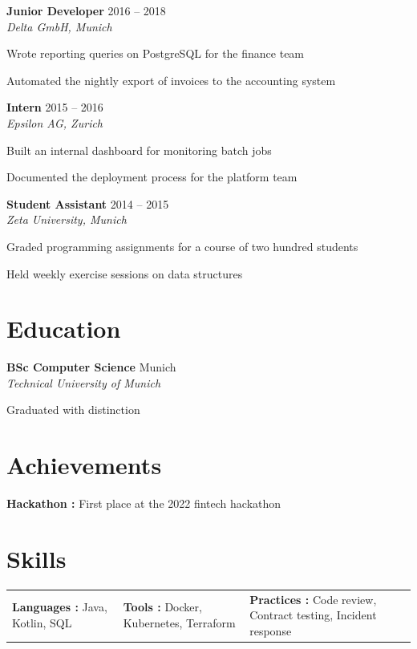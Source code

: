 \documentclass[10pt]{extarticle}
\newcommand{\role}[3]{%
  \textbf{#1} \hfill {\color{soft}\small #3}\\[-1pt]
  {\itshape\small #2}\par
}
\newcommand{\edu}[3]{%
  \textbf{#1} \hfill {\color{soft}\small #3}\\[-1pt]
  {\itshape\small #2}\par
}
\begin{document}
\role{Junior Developer}{Delta GmbH, Munich}{2016 – 2018}

\begin{tightlist}
    \item Wrote reporting queries on PostgreSQL for the finance team

    \item Automated the nightly export of invoices to the accounting system

\end{tightlist}

\role{Intern}{Epsilon AG, Zurich}{2015 – 2016}

\begin{tightlist}
    \item Built an internal dashboard for monitoring batch jobs

    \item Documented the deployment process for the platform team

\end{tightlist}

\role{Student Assistant}{Zeta University, Munich}{2014 – 2015}

\begin{tightlist}
    \item Graded programming assignments for a course of two hundred students

    \item Held weekly exercise sessions on data structures

\end{tightlist}

\section{Education}

\edu{BSc Computer Science}{Technical University of Munich}{Munich}

{\footnotesize Graduated with distinction}

\section{Achievements}

\begin{tightlist}
\item \textbf{Hackathon :} First place at the 2022 fintech hackathon
\end{tightlist}

\section{Skills}

\begin{tabular}{p{}p{}p{}}
\textbf{Languages :} Java, Kotlin, SQL & \textbf{Tools :} Docker, Kubernetes, Terraform & \textbf{Practices :} Code review, Contract testing, Incident response
\end{tabular}
\end{document}
